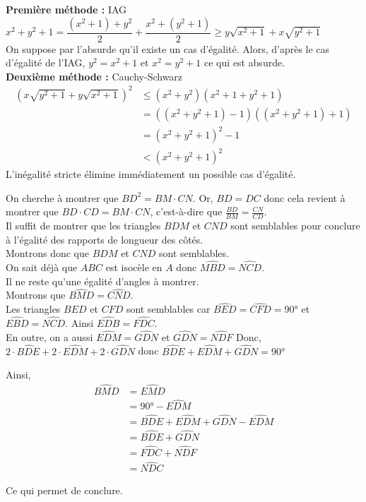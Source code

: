 \begin{sol}
\textbf{Première méthode :} IAG \\
$x^2 + y^2 + 1 = \dfrac{(x^2+1)+y^2}{2} + \dfrac{x^2+(y^2+1)}{2} \geq y\sqrt{x^2+1}+x\sqrt{y^2+1}$\\ On suppose par l'absurde qu'il existe un cas d'égalité. Alors, d'après le cas d'égalité de l'IAG, $y^2=x^2+1$ et $x^2 = y^2+1$ ce qui est absurde.\\
\textbf{Deuxième méthode :} Cauchy-Schwarz
\begin{align*}
\left( x\sqrt{y^2+1} + y \sqrt{x^2+1} \right)^2 &\leq \left( x^2 + y^2 \right) \left( x^2 + 1 +y^2 + 1 \right) \\ 
&= \left(\left( x^2 + y^2 +1\right) -1 \right) \left(\left( x^2 +y^2 + 1\right) + 1 \right) \\
&= \left( x^2 +y^2 +1 \right)^2 - 1 \\
&< \left( x^2 +y^2 +1 \right)^2 
\end{align*}
L'inégalité stricte élimine immédiatement un possible cas d'égalité.
\end{sol}


\begin{sol} 
On cherche à montrer que $BD^2= BM \cdot CN$. Or, $BD = DC$ donc cela revient à montrer que $BD \cdot CD = BM \cdot CN$, c'est-à-dire que $\frac{BD}{BM} = \frac{CN}{CD}$.\\ Il suffit de montrer que les triangles $BDM$ et $CND$ sont semblables pour conclure à l'égalité des rapports de longueur des côtés. \\ Montrons donc que $BDM$ et $CND$ sont semblables. \\ On sait déjà que $ABC$ est isocèle en $A$ donc $\widehat{MBD} = \widehat{NCD}$. \\ Il ne reste qu'une égalité d'angles à montrer. \\ Montrons que $\widehat{BMD} = \widehat{CND}$. \\ Les triangles $BED$ et $CFD$ sont semblables car $\widehat{BED} = \widehat{CFD} = 90°$ et $\widehat{EBD} = \widehat{NCD}$. Ainsi $\widehat{EDB} = \widehat{FDC}$. \\ En outre, on a aussi $\widehat{EDM} = \widehat{GDN}$ et $\widehat{GDN} = \widehat{NDF}$  Donc, $2 \cdot \widehat{BDE} + 2 \cdot \widehat{EDM} + 2 \cdot \widehat{GDN}$ donc $\widehat{BDE} + \widehat{EDM} + \widehat{GDN} = 90°$

Ainsi, \begin{align*} 
\widehat{BMD} &= \widehat{EMD} \\ &= 90°-\widehat{EDM} \\ &= \widehat{BDE} + \widehat{EDM} + \widehat{GDN} - \widehat{EDM} \\ &= \widehat{BDE} + \widehat{GDN} \\ &= \widehat{FDC} + \widehat{NDF} \\ &= \widehat{NDC} 
\end{align*}

Ce qui permet de conclure. 
\end{sol}